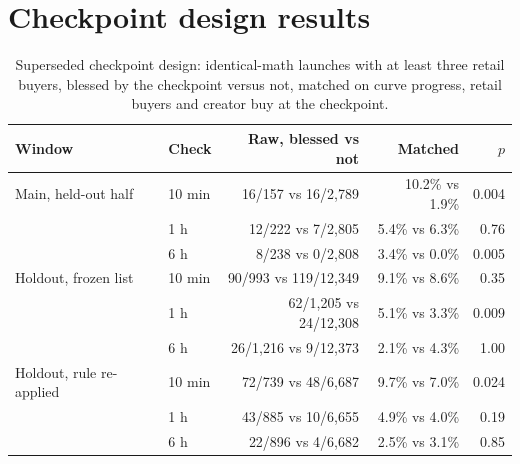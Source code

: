\documentclass{ledger}
\begin{document}
\section{Checkpoint design results}\label{appendix-b}

\begin{table}[h]
\centering\small
\caption{Superseded checkpoint design: identical-math launches with at least three retail buyers, blessed by the checkpoint versus not, matched on curve progress, retail buyers and creator buy at the checkpoint.}\label{tab:checkpoint}
\footnotesize
\begin{tabular}{@{}>{\raggedright\arraybackslash}p{2.9cm}lrrr@{}}
\toprule
Window & Check & Raw, blessed vs not & Matched & $p$ \\
\midrule
Main, held-out half & 10 min & 16/157 vs 16/2,789 & 10.2\% vs 1.9\% & 0.004 \\
 & 1 h & 12/222 vs 7/2,805 & 5.4\% vs 6.3\% & 0.76 \\
 & 6 h & 8/238 vs 0/2,808 & 3.4\% vs 0.0\% & 0.005 \\
Holdout, frozen list & 10 min & 90/993 vs 119/12,349 & 9.1\% vs 8.6\% & 0.35 \\
 & 1 h & 62/1,205 vs 24/12,308 & 5.1\% vs 3.3\% & 0.009 \\
 & 6 h & 26/1,216 vs 9/12,373 & 2.1\% vs 4.3\% & 1.00 \\
Holdout, rule re-applied & 10 min & 72/739 vs 48/6,687 & 9.7\% vs 7.0\% & 0.024 \\
 & 1 h & 43/885 vs 10/6,655 & 4.9\% vs 4.0\% & 0.19 \\
 & 6 h & 22/896 vs 4/6,682 & 2.5\% vs 3.1\% & 0.85 \\
\bottomrule
\end{tabular}
\end{table}
\end{document}
